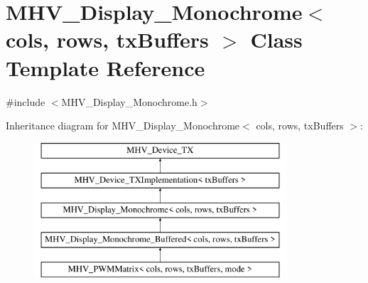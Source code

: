 \hypertarget{class_m_h_v___display___monochrome}{\section{M\-H\-V\-\_\-\-Display\-\_\-\-Monochrome$<$ cols, rows, tx\-Buffers $>$ Class Template Reference}
\label{class_m_h_v___display___monochrome}
}


{\ttfamily \#include $<$M\-H\-V\-\_\-\-Display\-\_\-\-Monochrome.\-h$>$}

Inheritance diagram for M\-H\-V\-\_\-\-Display\-\_\-\-Monochrome$<$ cols, rows, tx\-Buffers $>$\-:\begin{figure}[H]
\begin{center}
\leavevmode
\includegraphics[height=5.000000cm]{class_m_h_v___display___monochrome}
\end{center}
\end{figure}
